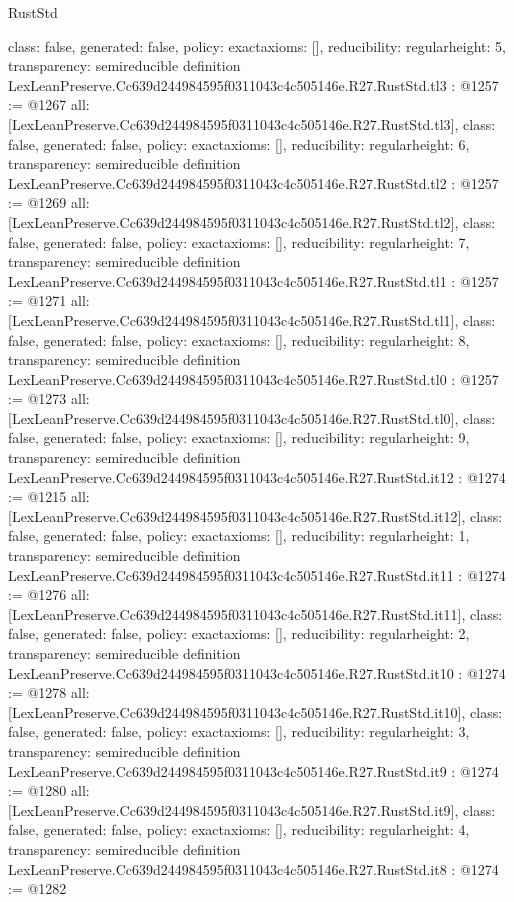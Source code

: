 \begin{lexlean}{RustStd}
\begin{coremodule}
{  class: false,
  generated: false,
  policy: exact{axioms: []},
  reducibility: regular{height: 5},
  transparency: semireducible
}
definition LexLeanPreserve.Cc639d244984595f0311043c4c505146e.R27.RustStd.tl3 : @1257 := @1267 {
  all: [LexLeanPreserve.Cc639d244984595f0311043c4c505146e.R27.RustStd.tl3],
  class: false,
  generated: false,
  policy: exact{axioms: []},
  reducibility: regular{height: 6},
  transparency: semireducible
}
definition LexLeanPreserve.Cc639d244984595f0311043c4c505146e.R27.RustStd.tl2 : @1257 := @1269 {
  all: [LexLeanPreserve.Cc639d244984595f0311043c4c505146e.R27.RustStd.tl2],
  class: false,
  generated: false,
  policy: exact{axioms: []},
  reducibility: regular{height: 7},
  transparency: semireducible
}
definition LexLeanPreserve.Cc639d244984595f0311043c4c505146e.R27.RustStd.tl1 : @1257 := @1271 {
  all: [LexLeanPreserve.Cc639d244984595f0311043c4c505146e.R27.RustStd.tl1],
  class: false,
  generated: false,
  policy: exact{axioms: []},
  reducibility: regular{height: 8},
  transparency: semireducible
}
definition LexLeanPreserve.Cc639d244984595f0311043c4c505146e.R27.RustStd.tl0 : @1257 := @1273 {
  all: [LexLeanPreserve.Cc639d244984595f0311043c4c505146e.R27.RustStd.tl0],
  class: false,
  generated: false,
  policy: exact{axioms: []},
  reducibility: regular{height: 9},
  transparency: semireducible
}
definition LexLeanPreserve.Cc639d244984595f0311043c4c505146e.R27.RustStd.it12 : @1274 := @1215 {
  all: [LexLeanPreserve.Cc639d244984595f0311043c4c505146e.R27.RustStd.it12],
  class: false,
  generated: false,
  policy: exact{axioms: []},
  reducibility: regular{height: 1},
  transparency: semireducible
}
definition LexLeanPreserve.Cc639d244984595f0311043c4c505146e.R27.RustStd.it11 : @1274 := @1276 {
  all: [LexLeanPreserve.Cc639d244984595f0311043c4c505146e.R27.RustStd.it11],
  class: false,
  generated: false,
  policy: exact{axioms: []},
  reducibility: regular{height: 2},
  transparency: semireducible
}
definition LexLeanPreserve.Cc639d244984595f0311043c4c505146e.R27.RustStd.it10 : @1274 := @1278 {
  all: [LexLeanPreserve.Cc639d244984595f0311043c4c505146e.R27.RustStd.it10],
  class: false,
  generated: false,
  policy: exact{axioms: []},
  reducibility: regular{height: 3},
  transparency: semireducible
}
definition LexLeanPreserve.Cc639d244984595f0311043c4c505146e.R27.RustStd.it9 : @1274 := @1280 {
  all: [LexLeanPreserve.Cc639d244984595f0311043c4c505146e.R27.RustStd.it9],
  class: false,
  generated: false,
  policy: exact{axioms: []},
  reducibility: regular{height: 4},
  transparency: semireducible
}
definition LexLeanPreserve.Cc639d244984595f0311043c4c505146e.R27.RustStd.it8 : @1274 := @1282 {
}
\end{coremodule}
\end{lexlean}
